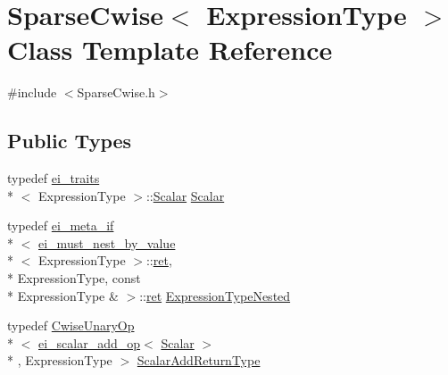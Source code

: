 \hypertarget{class_sparse_cwise}{\section{Sparse\-Cwise$<$ Expression\-Type $>$ Class Template Reference}
\label{class_sparse_cwise}
}


{\ttfamily \#include $<$Sparse\-Cwise.\-h$>$}

\subsection*{Public Types}
\begin{DoxyCompactItemize}
\item 
typedef \hyperlink{structei__traits}{ei\-\_\-traits}\\*
$<$ Expression\-Type $>$\-::\hyperlink{class_sparse_cwise_ad74c0517fbc31c6ef82186ae79723bea}{Scalar} \hyperlink{class_sparse_cwise_ad74c0517fbc31c6ef82186ae79723bea}{Scalar}
\item 
typedef \hyperlink{structei__meta__if}{ei\-\_\-meta\-\_\-if}\\*
$<$ \hyperlink{structei__must__nest__by__value}{ei\-\_\-must\-\_\-nest\-\_\-by\-\_\-value}\\*
$<$ Expression\-Type $>$\-::\hyperlink{group___i_p_conn_plugin_gabc99fe6afec1a75ccff1092e47375a40}{ret}, \\*
Expression\-Type, const \\*
Expression\-Type \& $>$\-::\hyperlink{group___i_p_conn_plugin_gabc99fe6afec1a75ccff1092e47375a40}{ret} \hyperlink{class_sparse_cwise_ae603d2da5a5b74a3adb93a21b4aa8c1e}{Expression\-Type\-Nested}
\item 
typedef \hyperlink{class_cwise_unary_op}{Cwise\-Unary\-Op}\\*
$<$ \hyperlink{structei__scalar__add__op}{ei\-\_\-scalar\-\_\-add\-\_\-op}$<$ \hyperlink{class_sparse_cwise_ad74c0517fbc31c6ef82186ae79723bea}{Scalar} $>$\\*
, Expression\-Type $>$ \hyperlink{class_sparse_cwise_a68e22bb26ee4171f2f7d2d762bd52215}{Scalar\-Add\-Return\-Type}
\end{DoxyCompactItemize}
